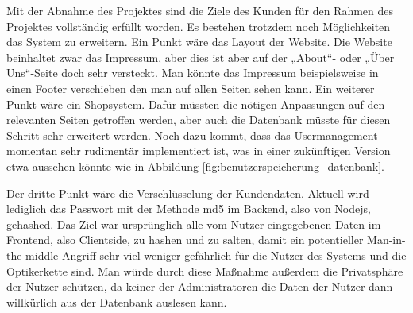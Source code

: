 Mit der Abnahme des Projektes sind die Ziele des Kunden für den Rahmen des Projektes vollständig erfüllt worden. Es bestehen trotzdem noch Möglichkeiten das System zu erweitern. Ein Punkt wäre das Layout der Website. Die Website beinhaltet zwar das Impressum, aber dies ist aber auf der „About“- oder „Über Uns“-Seite doch sehr versteckt. Man könnte das Impressum beispielsweise in einen Footer verschieben den man auf allen Seiten sehen kann. Ein weiterer Punkt wäre ein Shopsystem. Dafür müssten die nötigen Anpassungen auf den relevanten Seiten getroffen werden, aber auch die Datenbank müsste für diesen Schritt sehr erweitert werden. Noch dazu kommt, dass das Usermanagement momentan sehr rudimentär implementiert ist, was in einer zukünftigen Version etwa aussehen könnte wie in Abbildung \ref{fig:benutzerspeicherung_datenbank}.


Der dritte Punkt wäre die Verschlüsselung der Kundendaten. Aktuell wird lediglich das Passwort mit der Methode md5 im Backend, also von Nodejs, gehashed. Das Ziel war ursprünglich alle vom Nutzer eingegebenen Daten im Frontend, also Clientside, zu hashen und zu salten, damit ein potentieller Man-in-the-middle-Angriff sehr viel weniger gefährlich für die Nutzer des Systems und die Optikerkette sind. Man würde durch diese Maßnahme außerdem die Privatsphäre der Nutzer schützen, da keiner der Administratoren die Daten der Nutzer dann willkürlich aus der Datenbank auslesen kann.
